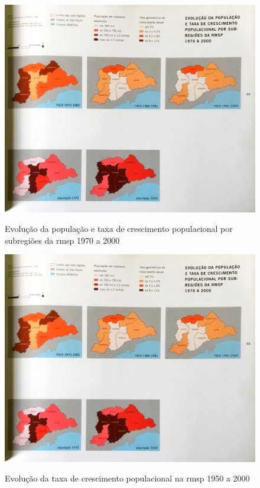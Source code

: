 	\begin{figure}[h]
		\centering
		\caption{Evolução da população e taxa de crescimento populacional por subregiões da \gls{rmsp} 1970 a 2000}
		\includegraphics[width=\linewidth,keepaspectratio]{img/spmetrop_pag055}
		\label{spmetrop_pag055}
	\end{figure}
	
	\begin{figure}[h]
		\centering
		\caption{Evolução da taxa de crescimento populacional na \gls{rmsp} 1950 a 2000 }
		\includegraphics[width=\linewidth,keepaspectratio]{img/spmetrop_pag055}
		\label{spmetrop_pag060}
	\end{figure}
	
